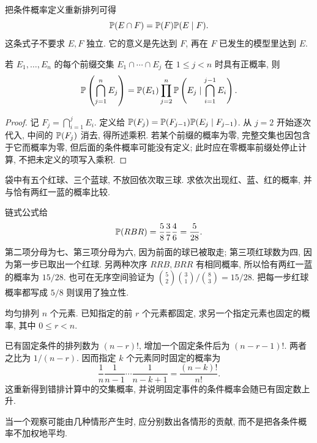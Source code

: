 把条件概率定义重新排列可得
\[
 \mathbb P(E\cap F)=\mathbb P(F)\mathbb P(E\mid F).
\]
这条式子不要求 $E,F$ 独立. 它的意义是先达到 $F$, 再在 $F$ 已发生的模型里达到 $E$.

\begin{theorem}[链式乘法公式]
若 $E_1,\ldots,E_n$ 的每个前缀交集 $E_1\cap\cdots\cap E_j$ 在 $1\leq j<n$ 时具有正概率, 则
\[
 \mathbb P\left(\bigcap_{j=1}^n E_j\right)
 =\mathbb P(E_1)\prod_{j=2}^n
 \mathbb P\left(E_j\mid\bigcap_{i=1}^{j-1}E_i\right).
\]
\end{theorem}
\begin{proof}
记 $F_j=\bigcap_{i=1}^jE_i$. 定义给 $\mathbb P(F_j)=\mathbb P(F_{j-1})\mathbb P(E_j\mid F_{j-1})$. 从 $j=2$ 开始逐次代入, 中间的 $\mathbb P(F_j)$ 消去, 得所述乘积. 若某个前缀的概率为零, 完整交集也因包含于它而概率为零, 但后面的条件概率可能没有定义; 此时应在零概率前缀处停止计算, 不把未定义的项写入乘积.
\end{proof}

\begin{example}
袋中有五个红球、三个蓝球, 不放回依次取三球. 求依次出现红、蓝、红的概率, 并与恰有两红一蓝的概率比较.
\end{example}
\begin{solution}
链式公式给
\[
 \mathbb P(RBR)=\frac58\frac37\frac46=\frac5{28}.
\]
第二项分母为七、第三项分母为六, 因为前面的球已被取走; 第三项红球数为四, 因为第一步已取出一个红球. 另两种次序 $RRB,BRR$ 有相同概率, 所以恰有两红一蓝的概率为 $15/28$. 也可在无序空间验证为 $\binom52\binom31/\binom83=15/28$. 把每一步红球概率都写成 $5/8$ 则误用了独立性.
\end{solution}

\begin{example}
均匀排列 $n$ 个元素. 已知指定的前 $r$ 个元素都固定, 求另一个指定元素也固定的概率, 其中 $0\leq r<n$.
\end{example}
\begin{solution}
已有固定条件的排列数为 $(n-r)!$, 增加一个固定条件后为 $(n-r-1)!$. 两者之比为 $1/(n-r)$. 因而指定 $k$ 个元素同时固定的概率为
\[
 \frac1n\frac1{n-1}\cdots\frac1{n-k+1}=\frac{(n-k)!}{n!}.
\]
这重新得到错排计算中的交集概率, 并说明固定事件的条件概率会随已有固定数上升.
\end{solution}

当一个观察可能由几种情形产生时, 应分别数出各情形的贡献, 而不是把各条件概率不加权地平均.


